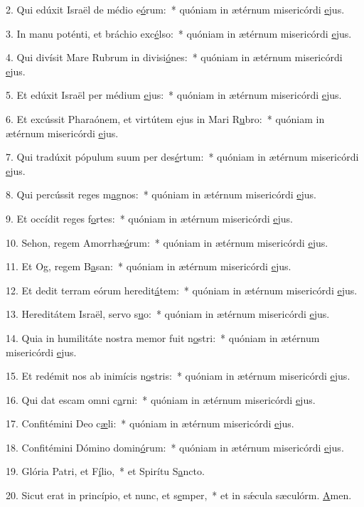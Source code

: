 2. Qui edúxit Israël de médio e\uline{ó}rum:~* quóniam in ætérnum misericórdi \uline{e}jus.\par 
3. In manu poténti, et bráchio exc\uline{é}lso:~* quóniam in ætérnum misericórdi \uline{e}jus.\par 
4. Qui divísit Mare Rubrum in divisi\uline{ó}nes:~* quóniam in ætérnum misericórdi \uline{e}jus.\par 
5. Et edúxit Israël per médium \uline{e}jus:~* quóniam in ætérnum misericórdi \uline{e}jus.\par 
6. Et excússit Pharaónem, et virtútem ejus in Mari R\uline{u}bro:~* quóniam in ætérnum misericórdi \uline{e}jus.\par 
7. Qui tradúxit pópulum suum per des\uline{é}rtum:~* quóniam in ætérnum misericórdi \uline{e}jus.\par 
8. Qui percússit reges m\uline{a}gnos:~* quóniam in ætérnum misericórdi \uline{e}jus.\par 
9. Et occídit reges f\uline{o}rtes:~* quóniam in ætérnum misericórdi \uline{e}jus.\par 
10. Sehon, regem Amorrhæ\uline{ó}rum:~* quóniam in ætérnum misericórdi \uline{e}jus.\par 
11. Et Og, regem B\uline{a}san:~* quóniam in ætérnum misericórdi \uline{e}jus.\par 
12. Et dedit terram eórum heredit\uline{á}tem:~* quóniam in ætérnum misericórdi \uline{e}jus.\par 
13. Hereditátem Israël, servo s\uline{u}o:~* quóniam in ætérnum misericórdi \uline{e}jus.\par 
14. Quia in humilitáte nostra memor fuit n\uline{o}stri:~* quóniam in ætérnum misericórdi \uline{e}jus.\par 
15. Et redémit nos ab inimícis n\uline{o}stris:~* quóniam in ætérnum misericórdi \uline{e}jus.\par 
16. Qui dat escam omni c\uline{a}rni:~* quóniam in ætérnum misericórdi \uline{e}jus.\par 
17. Confitémini Deo c\uline{æ}li:~* quóniam in ætérnum misericórdi \uline{e}jus.\par 
18. Confitémini Dómino domin\uline{ó}rum:~* quóniam in ætérnum misericórdi \uline{e}jus.\par 
19. Glória Patri, et F\uline{í}lio,~* et Spirítu S\uline{a}ncto.\par 
20. Sicut erat in princípio, et nunc, et s\uline{e}mper,~* et in sǽcula sæculórm. \uline{A}men.\par 
